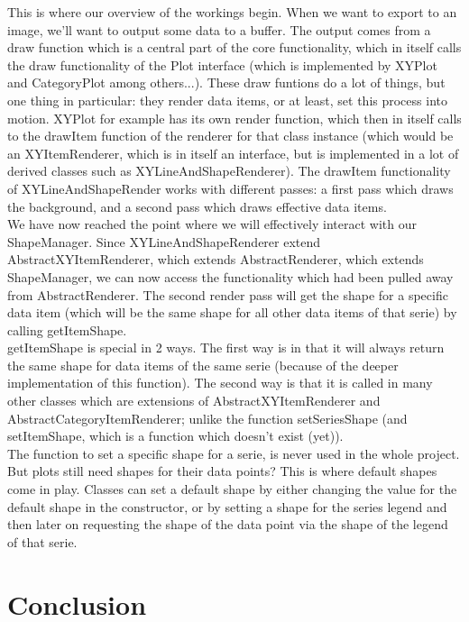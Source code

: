 \documentclass{article}
\begin{document}
This is where our overview of the workings begin. When we want to export to an image, we'll want to output some data to a buffer. The output comes from a draw function which is a central part of the core functionality, which in itself calls the draw functionality of the Plot interface (which is implemented by XYPlot and CategoryPlot among others...). These draw funtions do a lot of things, but one thing in particular: they render data items, or at least, set this process into motion. XYPlot for example has its own render function, which then in itself calls to the drawItem function of the renderer for that class instance (which would be an XYItemRenderer, which is in itself an interface, but is implemented in a lot of derived classes such as XYLineAndShapeRenderer). The drawItem functionality of XYLineAndShapeRender works with different passes: a first pass which draws the background, and a second pass which draws effective data items.\\

We have now reached the point where we will effectively interact with our ShapeManager. Since XYLineAndShapeRenderer extend AbstractXYItemRenderer, which extends AbstractRenderer, which extends ShapeManager, we can now access the functionality which had been pulled away from AbstractRenderer. The second render pass will get the shape for a specific data item (which will be the same shape for all other data items of that serie) by calling getItemShape.\\

getItemShape is special in 2 ways. The first way is in that it will always return the same shape for data items of the same serie (because of the deeper implementation of this function). The second way is that it is called in many other classes which are extensions of AbstractXYItemRenderer and AbstractCategoryItemRenderer; unlike the function setSeriesShape (and setItemShape, which is a function which doesn't exist (yet)).\\

The function to set a specific shape for a serie, is never used in the whole project. But plots still need shapes for their data points? This is where default shapes come in play. Classes can set a default shape by either changing the value for the default shape in the constructor, or by setting a shape for the series legend and then later on requesting the shape of the data point via the shape of the legend of that serie. 



\newpage
\section{Conclusion}
\end{document}
